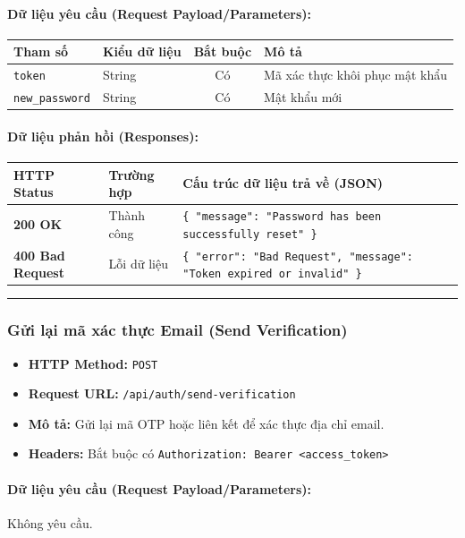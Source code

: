 \documentclass[12pt,a4paper]{article}
\begin{document}
\paragraph{Dữ liệu yêu cầu (Request Payload/Parameters):}
\begin{longtable}{|p{2.8cm}|p{2.2cm}|c|p{7.0cm}|}
\hline
\textbf{Tham số} & \textbf{Kiểu dữ liệu} & \textbf{Bắt buộc} & \textbf{Mô tả} \\ \hline
\endhead
\texttt{token} & String & Có & Mã xác thực khôi phục mật khẩu \\ \hline
\texttt{new\_password} & String & Có & Mật khẩu mới \\ \hline
\end{longtable}

\paragraph{Dữ liệu phản hồi (Responses):}
\begin{longtable}{|p{2.8cm}|p{3.2cm}|p{8.0cm}|}
\hline
\textbf{HTTP Status} & \textbf{Trường hợp} & \textbf{Cấu trúc dữ liệu trả về (JSON)} \\ \hline
\endhead
\textbf{200 OK} & Thành công & \texttt{\{ "message": "Password has been successfully reset" \}} \\ \hline
\textbf{400 Bad Request} & Lỗi dữ liệu & \texttt{\{ "error": "Bad Request", "message": "Token expired or invalid" \}} \\ \hline
\end{longtable}

\vskip 0.4cm
\noindent\rule{\textwidth}{0.3pt}
\vskip 0.4cm

\subsubsection{Gửi lại mã xác thực Email (Send Verification)}
\begin{itemize}[leftmargin=*]
    \item \textbf{HTTP Method:} \texttt{POST}
    \item \textbf{Request URL:} \texttt{/api/auth/send-verification}
    \item \textbf{Mô tả:} Gửi lại mã OTP hoặc liên kết để xác thực địa chỉ email.
    \item \textbf{Headers:} Bắt buộc có \texttt{Authorization: Bearer \textless{}access\_token\textgreater{}}
\end{itemize}

\paragraph{Dữ liệu yêu cầu (Request Payload/Parameters):}
Không yêu cầu.\\
\end{document}
